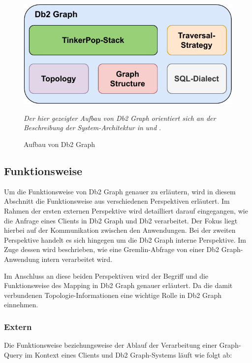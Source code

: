 \begin{figure}[ht]
    \centering
    \includegraphics[width=\textwidth]{images/db2graph_components.pdf}
    \caption{Aufbau von Db2 Graph}
    \label{fig:db2graph_aufbau}
    \vspace{0.5em}
    \textit{Der hier gezeigter Aufbau von Db2 Graph   orientiert sich an der Beschreibung der System-Architektur in} \cite{vldb_tian} \textit{und} \cite{sigmod_tian}\textit{.}
\end{figure}

\subsection{Funktionsweise}
\label{db2graph:funktionsweise}
Um die Funktionsweise von Db2 Graph genauer zu erläutern, wird in diesem Abschnitt die Funktionsweise aus verschiedenen Perspektiven erläutert. Im Rahmen der ersten externen Perspektive wird detailliert darauf eingegangen, wie die Anfrage eines Clients in Db2 Graph und Db2 verarbeitet. Der Fokus liegt hierbei auf der Kommunikation zwischen den Anwendungen. Bei der zweiten Perspektive handelt es sich hingegen um die Db2 Graph interne Perspektive. Im Zuge dessen wird beschrieben, wie eine Gremlin-Abfrage von einer Db2 Graph-Anwendung intern verarbeitet wird. 

Im Anschluss an diese beiden Perspektiven wird der Begriff und die Funktionsweise des Mapping in Db2 Graph genauer erläutert. Da die damit verbundenen Topologie-Informationen eine wichtige Rolle in Db2 Graph einnehmen. 

\subsubsection{Extern}
Die Funktionsweise beziehungsweise der Ablauf der Verarbeitung einer Graph-Query im Kontext eines Clients und Db2 Graph-Systems läuft wie folgt ab:


